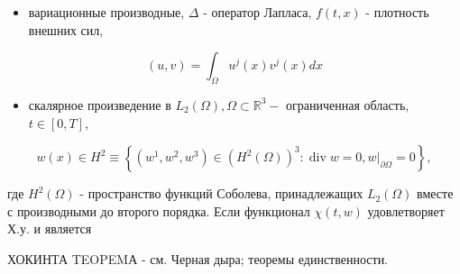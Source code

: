 \documentclass[10pt]{article}
\begin{document}
\begin{itemize}

  \item вариационные производные, $\Delta$ - оператор Лапласа, $f(t, x)$ - плотность внешних сил,

\end{itemize}



\[

(u, v)=\int_{\Omega} u^{j}(x) v^{j}(x) d x

\]



\begin{itemize}

  \item скалярное произведение в $L_{2}(\Omega), \Omega \subset \mathbb{R}^{3}-$ ограниченная область, $t \in[0, T]$,

\end{itemize}



\[

w(x) \in H^{2} \equiv\left\{\left(w^{1}, w^{2}, w^{3}\right) \in\left(H^{2}(\Omega)\right)^{3}: \operatorname{div} w=0,\left.w\right|_{\partial \Omega}=0\right\},

\]



где $H^{2}(\Omega)$ - пространство функций Соболева, принадлежащих $L_{2}(\Omega)$ вместе с производными до второго порядка. Если функционал $\chi(t, w)$ удовлетворяет Х.у. и является



ХОКИНТА TEOPEMА - см. Черная дыра; теоремы единственности.
\end{document}
